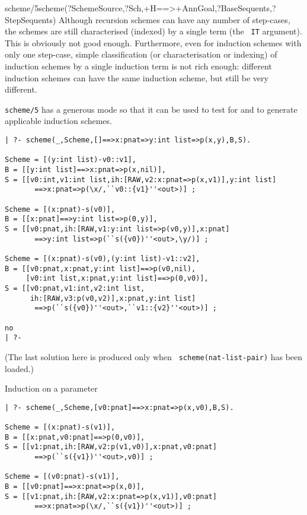 \begin{predicate}{scheme/5}{scheme(?SchemeSource,?Sch,+H==>+AnnGoal,?BaseSequents,?StepSequents)}
Although recursion schemes can have any number of step-cases, the
schemes are still characterised (indexed) by a single term (the {\tt
IT} argument).  This is obviously not good enough.  Furthermore, even
for induction schemes with only one step-case, simple classification
(or characterisation or indexing) of induction schemes by a single
induction term is not rich enough: different induction schemes can
have the same induction scheme, but still be very different.

\begin{ex}
{\tt scheme/5} has a generous mode so that it
can be used to test for and to generate applicable induction schemes.

\begin{verbatim}
| ?- scheme(_,Scheme,[]==>x:pnat=>y:int list=>p(x,y),B,S).

Scheme = [(y:int list)-v0::v1],
B = [[y:int list]==>x:pnat=>p(x,nil)],
S = [[v0:int,v1:int list,ih:[RAW,v2:x:pnat=>p(x,v1)],y:int list]
       ==>x:pnat=>p(\x/,``v0::{v1}''<out>)] ;

Scheme = [(x:pnat)-s(v0)],
B = [[x:pnat]==>y:int list=>p(0,y)],
S = [[v0:pnat,ih:[RAW,v1:y:int list=>p(v0,y)],x:pnat]
       ==>y:int list=>p(``s({v0})''<out>,\y/)] ;

Scheme = [(x:pnat)-s(v0),(y:int list)-v1::v2],
B = [[v0:pnat,x:pnat,y:int list]==>p(v0,nil),
     [v0:int list,x:pnat,y:int list]==>p(0,v0)],
S = [[v0:pnat,v1:int,v2:int list,
      ih:[RAW,v3:p(v0,v2)],x:pnat,y:int list]
       ==>p(``s({v0})''<out>,``v1::{v2}''<out>)] ;

no
| ?-
\end{verbatim}
(The last solution here is produced only when {\tt
scheme(nat-list-pair)} has been loaded.)
\end{ex}

\begin{ex}Induction on a parameter
\begin{verbatim}
| ?- scheme(_,Scheme,[v0:pnat]==>x:pnat=>p(x,v0),B,S).

Scheme = [(x:pnat)-s(v1)],
B = [[x:pnat,v0:pnat]==>p(0,v0)],
S = [[v1:pnat,ih:[RAW,v2:p(v1,v0)],x:pnat,v0:pnat]
       ==>p(``s({v1})''<out>,v0)] ;

Scheme = [(v0:pnat)-s(v1)],
B = [[v0:pnat]==>x:pnat=>p(x,0)],
S = [[v1:pnat,ih:[RAW,v2:x:pnat=>p(x,v1)],v0:pnat]
       ==>x:pnat=>p(\x/,``s({v1})''<out>)] ;
\end{verbatim}
\end{ex}


\end{predicate}
